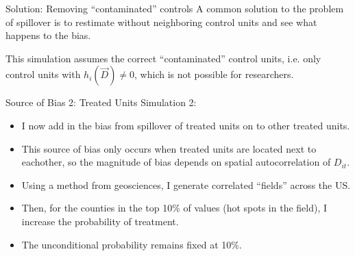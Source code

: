 \documentclass[aspectratio=169]{beamer}
\begin{document}
\begin{frame}{Solution: Removing ``contaminated'' controls}
    A common solution to the problem of spillover is to restimate without neighboring control units and see what happens to the bias.

    This simulation assumes the correct ``contaminated'' control units, i.e. only control units with $h_i(\vec{D}) \neq 0$, which is not possible for researchers.
\end{frame}



\begin{frame}{Source of Bias 2: Treated Units}
    Simulation 2:

    \begin{itemize}
        \item I now add in the bias from spillover of treated units on to other treated units.
        
        \item This source of bias only occurs when treated units are located next to eachother, so the magnitude of bias depends on spatial autocorrelation of $D_{it}$. 
        
        \item Using a method from geosciences, I generate correlated ``fields'' across the US. 
        
        \item Then, for the counties in the top 10\% of values (hot spots in the field), I increase the probability of treatment. 
        
        \item The unconditional probability remains fixed at 10\%.
    \end{itemize}
\end{frame}





\end{document}
